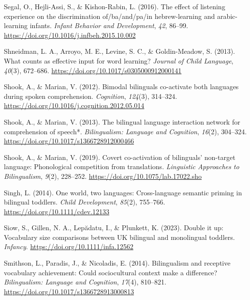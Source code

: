 \documentclass[
  12pt,
  b5paperpaper,
  twoside]{scrreprt}
\newlength{\cslhangindent}
\newlength{\cslentryspacingunit} %
\newenvironment{CSLReferences}[2] %
 {%
  \setlength{\parindent}{0pt}
  \ifodd #1
  \let\oldpar\par
  \def\par{\hangindent=\cslhangindent\oldpar}
  \fi
  \setlength{\parskip}{#2\cslentryspacingunit}
 }%
 {}
\begin{document}
\begin{CSLReferences}{1}{0}
\leavevmode{}%
Segal, O., Hejli-Assi, S., \& Kishon-Rabin, L. (2016). The effect of
listening experience on the discrimination of/ba/and/pa/in
hebrew-learning and arabic-learning infants. \emph{Infant Behavior and
Development}, \emph{42}, 86--99.
\url{https://doi.org/10.1016/j.infbeh.2015.10.002}

\leavevmode{}%
Shneidman, L. A., Arroyo, M. E., Levine, S. C., \& Goldin-Meadow, S.
(2013). What counts as effective input for word learning? \emph{Journal
of Child Language}, \emph{40}(3), 672--686.
\url{https://doi.org/10.1017/s0305000912000141}

\leavevmode{}%
Shook, A., \& Marian, V. (2012). Bimodal bilinguals co-activate both
languages during spoken comprehension. \emph{Cognition}, \emph{124}(3),
314--324. \url{https://doi.org/10.1016/j.cognition.2012.05.014}

\leavevmode{}%
Shook, A., \& Marian, V. (2013). The bilingual language interaction
network for comprehension of speech*. \emph{Bilingualism: Language and
Cognition}, \emph{16}(2), 304--324.
\url{https://doi.org/10.1017/s1366728912000466}

\leavevmode{}%
Shook, A., \& Marian, V. (2019). Covert co-activation of bilinguals'
non-target language: Phonological competition from translations.
\emph{Linguistic Approaches to Bilingualism}, \emph{9}(2), 228--252.
\url{https://doi.org/10.1075/lab.17022.sho}

\leavevmode{}%
Singh, L. (2014). One world, two languages: Cross-language semantic
priming in bilingual toddlers. \emph{Child Development}, \emph{85}(2),
755--766. \url{https://doi.org/10.1111/cdev.12133}

\leavevmode{}%
Siow, S., Gillen, N. A., Lepădatu, I., \& Plunkett, K. (2023). Double it
up: Vocabulary size comparisons between {UK} bilingual and monolingual
toddlers. \emph{Infancy}. \url{https://doi.org/10.1111/infa.12562}

\leavevmode{}%
Smithson, L., Paradis, J., \& Nicoladis, E. (2014). Bilingualism and
receptive vocabulary achievement: Could sociocultural context make a
difference? \emph{Bilingualism: Language and Cognition}, \emph{17}(4),
810--821. \url{https://doi.org/10.1017/s1366728913000813}


\end{CSLReferences}
\end{document}
